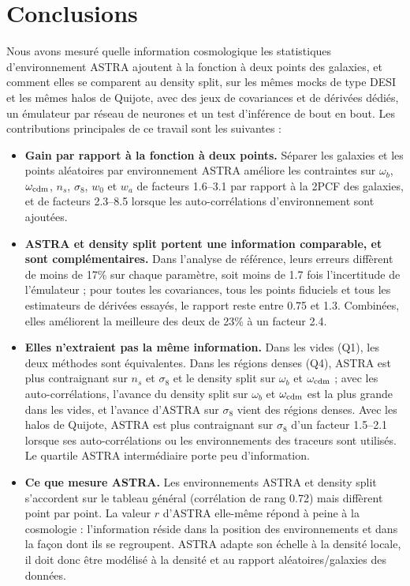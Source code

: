 \section{Conclusions}

Nous avons mesuré quelle information cosmologique les statistiques d'environnement ASTRA ajoutent à la fonction à deux points des galaxies, et comment elles se comparent au density split, sur les mêmes mocks de type DESI et les mêmes halos de Quijote, avec des jeux de covariances et de dérivées dédiés, un émulateur par réseau de neurones et un test d'inférence de bout en bout. Les contributions principales de ce travail sont les suivantes :
\begin{itemize}
\item \textbf{Gain par rapport à la fonction à deux points.} Séparer les galaxies et les points aléatoires par environnement ASTRA améliore les contraintes sur $\omega_b$, $\omega_{\rm cdm}$, $n_s$, $\sigma_8$, $w_0$ et $w_a$ de facteurs 1.6--3.1 par rapport à la 2PCF des galaxies, et de facteurs 2.3--8.5 lorsque les auto-corrélations d'environnement sont ajoutées.
\item \textbf{ASTRA et density split portent une information comparable, et sont complémentaires.} Dans l'analyse de référence, leurs erreurs diffèrent de moins de 17\% sur chaque paramètre, soit moins de 1.7 fois l'incertitude de l'émulateur ; pour toutes les covariances, tous les points fiduciels et tous les estimateurs de dérivées essayés, le rapport reste entre 0.75 et 1.3. Combinées, elles améliorent la meilleure des deux de 23\% à un facteur 2.4.
\item \textbf{Elles n'extraient pas la même information.} Dans les vides (Q1), les deux méthodes sont équivalentes. Dans les régions denses (Q4), ASTRA est plus contraignant sur $n_s$ et $\sigma_8$ et le density split sur $\omega_b$ et $\omega_{\rm cdm}$ ; avec les auto-corrélations, l'avance du density split sur $\omega_b$ et $\omega_{\rm cdm}$ est la plus grande dans les vides, et l'avance d'ASTRA sur $\sigma_8$ vient des régions denses. Avec les halos de Quijote, ASTRA est plus contraignant sur $\sigma_8$ d'un facteur 1.5--2.1 lorsque ses auto-corrélations ou les environnements des traceurs sont utilisés. Le quartile ASTRA intermédiaire porte peu d'information.
\item \textbf{Ce que mesure ASTRA.} Les environnements ASTRA et density split s'accordent sur le tableau général (corrélation de rang 0.72) mais diffèrent point par point. La valeur $r$ d'ASTRA elle-même répond à peine à la cosmologie : l'information réside dans la position des environnements et dans la façon dont ils se regroupent. ASTRA adapte son échelle à la densité locale, il doit donc être modélisé à la densité et au rapport aléatoires/galaxies des données.

\end{itemize}
